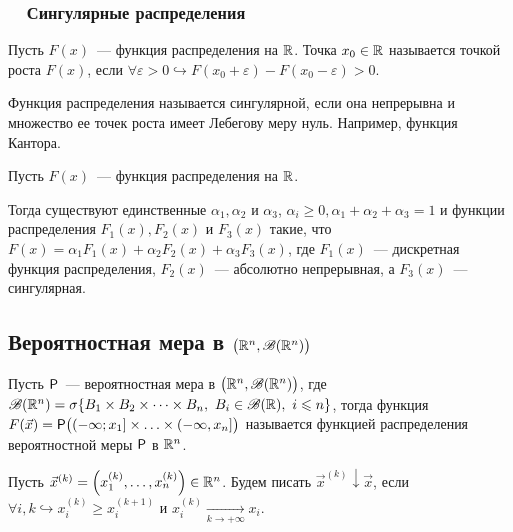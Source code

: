 \subsubsection*{~~Сингулярные распределения}
\begin{definition}
	Пусть $F(x)$~--- функция распределения на $\R$. Точка $x_0 \in \R$ называется точкой роста $F(x)$, если $\forall \varepsilon > 0 \hookrightarrow F(x_0 + \varepsilon) - F(x_0 - \varepsilon) > 0$.
\end{definition}

\begin{definition}
	Функция распределения называется сингулярной, если она непрерывна и множество ее точек роста имеет Лебегову меру нуль. Например, функция Кантора.
\end{definition}
\begin{theorem}
	Пусть $F(x)$~--- функция распределения на $\R$.
	
	Тогда существуют единственные $\alpha_1, \alpha_2$ и $\alpha_3$, $\alpha_i \geqslant 0, \alpha_1 + \alpha_2 + \alpha_3 = 1$ и функции распределения $F_1(x), F_2(x)$ и $F_3(x)$ такие, что $F(x) = \alpha_1 F_1(x) + \alpha_2 F_2(x) + \alpha_3 F_3(x)$, где $F_1(x)$~--- дискретная функция распределения, $F_2(x)$~--- абсолютно непрерывная, а $F_3(x)$~--- сингулярная. 
\end{theorem}

\subsection{Вероятностная мера в $\big( \R^n, \B(\R^n) \big)$}
\begin{definition}
	Пусть $\P$~--- вероятностная мера в $\big( \R^n, \B(\R^n) \big)$, где $\B(\R^n) = \sigma\{B_1 \times B_2 \times \dots \times B_n,\ B_i \in \B(\R),\ i \leqslant n \}$, тогда функция $F(\vec x) = \P\big((-\infty; x_1] \times \ldots \times (-\infty, x_n]\big)$ называется функцией распределения вероятностной меры $\P$ в $\R^n$.
\end{definition}

\begin{note}
	Пусть $\vec x^{(k)} = \left(x_1^{(k)}, \ldots, x_n^{(k)}\right) \in \R^n$. Будем писать $\vec x^{(k)} \downarrow \vec x$, если $\forall i, k \hookrightarrow x_i^{(k)} \geqslant x_i^{(k + 1)}$ и $x_i^{(k)} \underset{k \rightarrow +\infty}{\longrightarrow} x_i$.
\end{note}

